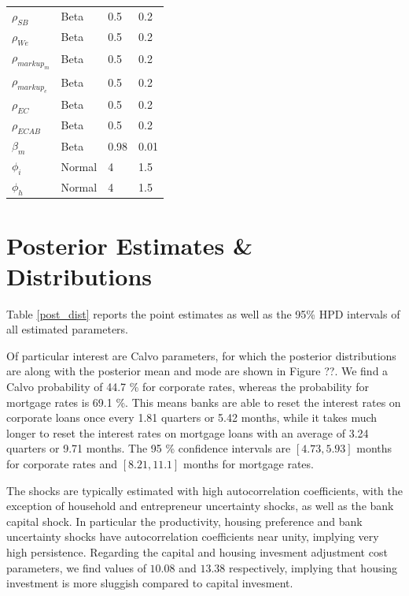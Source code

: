 \documentclass[12pt]{article}
\numberwithin{equation}{section}
\begin{document}
\begin{table}[H]
\begin{tabular}{l|l|l|l}
$\rho_{SB}$ & Beta & 0.5 & 0.2 \\
$\rho_{We}$ & Beta & 0.5 & 0.2 \\
$\rho_{markup_m}$ & Beta & 0.5 & 0.2 \\
$\rho_{markup_e}$ & Beta & 0.5 & 0.2 \\
$\rho_{EC}$ & Beta & 0.5 & 0.2 \\
$\rho_{ECAB}$ & Beta & 0.5 & 0.2 \\
$\beta_m$ 	  &   Beta   &  0.98   & 0.01    \\
$\phi_i$ 	  &   Normal   &  4   & 1.5    \\
$\phi_h$ 	  &   Normal  &   4   & 1.5  \\
\end{tabular}
\end{table}

\section*{Posterior Estimates \& Distributions}

Table \ref{post_dist} reports the point estimates as well as the 95\% HPD intervals of all estimated parameters.

Of particular interest are Calvo parameters, for which the posterior distributions are along with the posterior mean and mode are shown in Figure ??. We find a Calvo probability of 44.7 \% for corporate rates, whereas the probability for mortgage rates is 69.1 \%. This means banks are able to reset the interest rates on corporate loans once every 1.81 quarters or 5.42 months, while it takes much longer to reset the interest rates on mortgage loans with an average of 3.24 quarters or 9.71 months. The 95 \% confidence intervals are $[4.73,5.93]$ months for corporate rates and $[8.21,11.1]$ months for mortgage rates.

The shocks are typically estimated with high autocorrelation coefficients, with the exception of household and entrepreneur uncertainty shocks, as well as the bank capital shock. In particular the productivity, housing preference and bank uncertainty shocks have autocorrelation coefficients near unity, implying very high persistence. Regarding the capital and housing invesment adjustment cost parameters, we find values of $10.08$ and $13.38$ respectively, implying that housing investment is more sluggish compared to capital invesment. 
\end{document}

